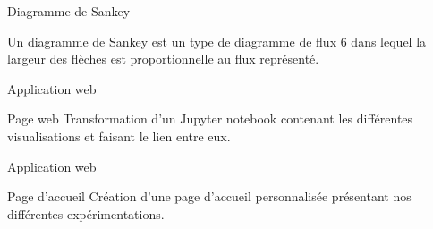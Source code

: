 \documentclass[10pt,handout]{beamer}
\newif\ifplacelogo %
\begin{document}
\begin{frame}{Diagramme de Sankey}
    \begin{block}{}
        Un diagramme de Sankey est un type de diagramme de flux 6 dans lequel la largeur des flèches
        est proportionnelle au flux représenté.
    \end{block}
\end{frame}
\placelogofalse
\begin{frame}{Application web}
    \begin{block}{Page web}
        Transformation d'un Jupyter notebook contenant les différentes visualisations et faisant le lien entre eux.
    \end{block}
\end{frame}

\begin{frame}{Application web}
    \begin{block}{Page d'accueil}
        Création d'une page d'accueil personnalisée présentant nos différentes expérimentations.
    \end{block}
\end{frame}
\placelogotrue
\end{document}
